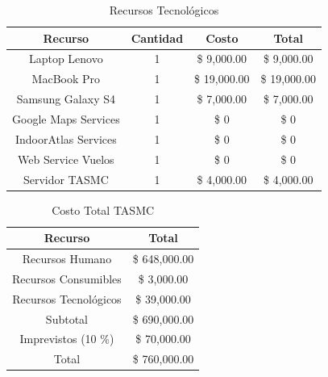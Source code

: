 \begin{table}[h] 
	\begin{center}
		\begin{tabular}{|c|c|c|c|}
			\hline \rowcolor[RGB]{51,153,255} 
			\textcolor{blanco}{\bf Recurso} &
				\textcolor{blanco}{\bf Cantidad} &
				\textcolor{blanco}{\bf Costo} &
				\textcolor{blanco}{\bf Total} \\
			\hline 
				Laptop Lenovo &
				1 &
				\$ 9,000.00 &
				\$ 9,000.00  \\
      		\hline \rowcolor[RGB]{240,248,255}
      			MacBook Pro &
				1 &
				\$ 19,000.00&
				\$ 19,000.00 \\
			\hline 
				Samsung Galaxy S4 &
				1 &
				\$ 7,000.00 &
				\$ 7,000.00  \\
      		\hline \rowcolor[RGB]{240,248,255}
      			Google Maps Services &
				1 &
				\$ 0 &
				\$ 0 \\
			\hline
				IndoorAtlas Services &
				1 &
				\$ 0 &
				\$ 0 \\
      		\hline \rowcolor[RGB]{240,248,255}
      			Web Service Vuelos &
				1 &
				\$ 0 &
				\$ 0 \\
			\hline
				Servidor TASMC &
				1 &
				\$ 4,000.00 &
				\$ 4,000.00 \\	
      		\hline 
    		\end{tabular}
	\end{center}
	\caption[Recursos Tecnológicos]{Recursos Tecnológicos} 
	\label{tab:recursosTecnologicos}
\end{table}

\begin{table} 
	\begin{center}
		\begin{tabular}{|c|c|}
			\hline \rowcolor[RGB]{51,153,255} 
			\textcolor{blanco}{\bf Recurso} &
				\textcolor{blanco}{\bf Total} \\
			\hline 
				Recursos Humano &
				\$ 648,000.00  \\
      		\hline \rowcolor[RGB]{240,248,255}
      			Recursos Consumibles &
				\$ 3,000.00  \\
			\hline 
				Recursos Tecnológicos &
				\$ 39,000.00  \\
      		\hline \rowcolor[RGB]{240,248,255}
      			Subtotal &
				\$ 690,000.00  \\
			\hline  
				Imprevistos (10 \%) &
				\$ 70,000.00  \\
      		\hline \rowcolor[RGB]{240,248,255}
      			Total &
				\$ 760,000.00 \\
      		\hline 
    		\end{tabular}
	\end{center}
	\caption[Costo Total TASMC]{Costo Total TASMC} 
	\label{tab:costoTasmc}
\end{table}
\vspace{3cm}
\newpage
